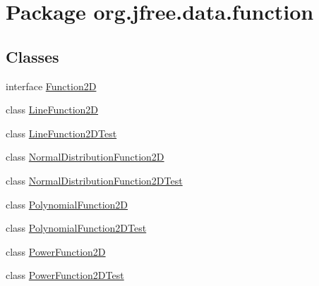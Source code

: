 \hypertarget{namespaceorg_1_1jfree_1_1data_1_1function}{}\section{Package org.\+jfree.\+data.\+function}
\label{namespaceorg_1_1jfree_1_1data_1_1function}
\subsection*{Classes}
\begin{DoxyCompactItemize}
\item 
interface \mbox{\hyperlink{interfaceorg_1_1jfree_1_1data_1_1function_1_1_function2_d}{Function2D}}
\item 
class \mbox{\hyperlink{classorg_1_1jfree_1_1data_1_1function_1_1_line_function2_d}{Line\+Function2D}}
\item 
class \mbox{\hyperlink{classorg_1_1jfree_1_1data_1_1function_1_1_line_function2_d_test}{Line\+Function2\+D\+Test}}
\item 
class \mbox{\hyperlink{classorg_1_1jfree_1_1data_1_1function_1_1_normal_distribution_function2_d}{Normal\+Distribution\+Function2D}}
\item 
class \mbox{\hyperlink{classorg_1_1jfree_1_1data_1_1function_1_1_normal_distribution_function2_d_test}{Normal\+Distribution\+Function2\+D\+Test}}
\item 
class \mbox{\hyperlink{classorg_1_1jfree_1_1data_1_1function_1_1_polynomial_function2_d}{Polynomial\+Function2D}}
\item 
class \mbox{\hyperlink{classorg_1_1jfree_1_1data_1_1function_1_1_polynomial_function2_d_test}{Polynomial\+Function2\+D\+Test}}
\item 
class \mbox{\hyperlink{classorg_1_1jfree_1_1data_1_1function_1_1_power_function2_d}{Power\+Function2D}}
\item 
class \mbox{\hyperlink{classorg_1_1jfree_1_1data_1_1function_1_1_power_function2_d_test}{Power\+Function2\+D\+Test}}
\end{DoxyCompactItemize}
